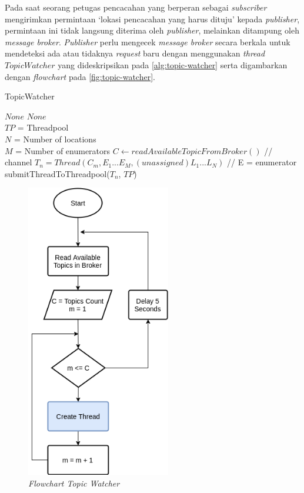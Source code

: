 Pada saat seorang petugas pencacahan yang berperan sebagai \textit{subscriber} mengirimkan permintaan `lokasi pencacahan yang harus dituju' kepada \textit{publisher}, permintaan ini tidak langsung diterima oleh \textit{publisher}, melainkan ditampung oleh \textit{message broker}. \textit{Publisher} perlu mengecek \textit{message broker} secara berkala untuk mendeteksi ada atau tidaknya \textit{request} baru dengan menggunakan \textit{thread} $TopicWatcher$ yang dideskripsikan pada \autoref{alg:topic-watcher} serta digambarkan dengan \textit{flowchart} pada \autoref{fig:topic-watcher}. 


\begin{algorithm}[!]
	\captionsetup{format=hang}
	\caption{TopicWatcher}
	\label{alg:topic-watcher}
	\begin{algorithmic}[1]
		\renewcommand{\algorithmicrequire}{\textbf{Input:}}
		\renewcommand{\algorithmicensure}{\textbf{Output:}}
		\REQUIRE $None$
		\ENSURE  $None$
		\\ $TP$ = Threadpool
		\\ $N$ = Number of locations
		\\ $M$ = Number of enumerators
		\STATE $C \leftarrow readAvailableTopicFromBroker()$	// channel
		\STATE $T_n = Thread(C_m, E_1...E_M, (unassigned) L_1...L_N)$		// E = enumerator
		\STATE submitThreadToThreadpool($T_n$, $TP$)
		\ENDIF
		\ENDFOR
		\ENDFOR
		\ENDWHILE
	\end{algorithmic}
\end{algorithm}


\begin{figure}[!]
	\centering
	\includegraphics[width=6.3cm]{Resources/Images/topic-watcher}
	\captionsetup{format=hang}
	\caption{\textit{\textit{Flowchart} Topic Watcher}}
	\label{fig:topic-watcher}
\end{figure}


